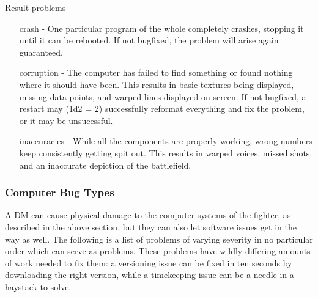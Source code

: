 \documentclass[a4paper]{article}
\begin{document}
\vspace{0.2cm}
Result problems
\begin{enumerate}[leftmargin=4cm]
\item [crash] - One particular program of the whole completely crashes, stopping it until it can be rebooted. If not bugfixed, the problem will arise again guaranteed.
\item [corruption] - The computer has failed to find something or found nothing where it should have been. This results in basic textures being displayed, missing data points, and warped lines displayed on screen. If not bugfixed, a restart may (1d2 = 2) successfully reformat everything and fix the problem, or it may be unsucessful.
\item [inaccuracies] - While all the components are properly working, wrong numbers keep consistently getting spit out. This results in warped voices, missed shots, and an inaccurate depiction of the battlefield.
\end{enumerate}


\subsubsection{Computer Bug Types} \label{fighter_computer_bug_types}

A DM can cause physical damage to the computer systems of the fighter, as described in the above section, but they can also let software issues get in the way as well. The following is a list of problems of varying severity in no particular order which can serve as problems. These problems have wildly differing amounts of work needed to fix them: a versioning issue can be fixed in ten seconds by downloading the right version, while a timekeeping issue can be a needle in a haystack to solve.
\end{document}
